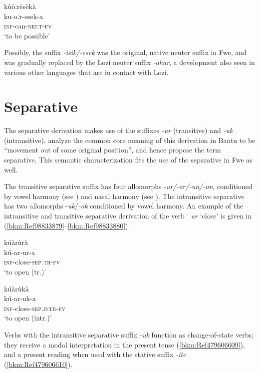 \ea
\label{bkm:Ref99029831}
\glll kùòːrèsèkà \\
ku-oːr-esek-a\\
\textsc{inf}-can-\textsc{neut}-\textsc{fv}\\
\glt ‘to be possible’
\z

Possibly, the suffix \textit{-isik/-esek} was the original, native neuter suffix in Fwe, and was gradually replaced by the Lozi neuter suffix \textit{-ahar}, a development also seen in various other languages that are in contact with Lozi.

\section{Separative}
\label{bkm:Ref485823385}\hypertarget{Toc75352662}{}\label{bkm:Ref486270693}\label{bkm:Ref486270391}
The separative derivation makes use of the suffixes \textit{-ur} (transitive) and \textit{-uk} (intransitive). { \citet[186]{SchadebergBostoen2019}} analyze the common core meaning of this derivation in Bantu to be “movement out of some original position”, and hence propose the term separative. This semantic characterization fits the use of the separative in Fwe as well.

\begin{sloppypar}
The transitive separative suffix has four allomorphs -\textit{ur/-or/-un/-on}, conditioned by vowel harmony (see ) and nasal harmony (see ). The intransitive separative has two allomorphs -\textit{uk}/\textit{-ok} conditioned by vowel harmony. An example of the intransitive and transitive separative derivation of the verb  \'{} \textit{ar} ‘close’ is given in (\ref{bkm:Ref98833879}--\ref{bkm:Ref98833880}).\end{sloppypar}

\ea
\label{bkm:Ref98833879}
\glll kúàrùrà\\
kú-ar-ur-a\\
\textsc{inf}-close-\textsc{sep}.\textsc{tr}-\textsc{fv}\\
\glt ‘to open (tr.)’
\z

\ea
\label{bkm:Ref98833880}
\glll kúàrùkà\\
kú-ar-uk-a\\
\textsc{inf}-close-\textsc{sep}.\textsc{intr}-\textsc{fv}\\
\glt ‘to open (intr.)’
\z

Verbs with the intransitive separative suffix \textit{-uk} function as change-of-state verbs; they receive a modal interpretation in the present tense (\ref{bkm:Ref479606609}), and a present reading when used with the stative suffix \textit{-ite} (\ref{bkm:Ref479606610}).

